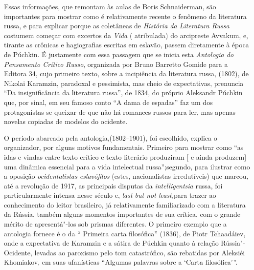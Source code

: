 Essas informações, que remontam às aulas de Boris Schnaiderman, são
importantes para mostrar como é relativamente recente o fenômeno da
literatura russa, e para explicar porque as coletâneas de \emph{História
da Literatura Russa} costumem começar com excertos da \emph{Vida} (
atribulada) do arcipreste Avvakum, e, tirante as crônicas e hagiografias
escritas em eslavão, passem diretamente à época de Púchkin. É
justamente com essa passagem que se inicia esta \emph{Antologia do
Pensamento Crítico Russo}, organizada por Bruno Barretto Gomide para a Editora 34, cujo
primeiro texto, sobre a incipiência da literatura russa, (1802), de
Nikolai Karamzin, paradoxal e pessimista, mas cheio de expectativas,
prenuncia ``Da insignificância da literatura russa'', de 1834, do
próprio Aleksandr Púchkin que, por sinal, em seu famoso conto ``A dama
de espadas'' faz um dos protagonistas se queixar de que não há romances
russos para ler, mas apenas novelas copiadas de modelos do ocidente.

O período abarcado pela antologia,(1802--1901), foi escolhido, explica o
organizador, por alguns motivos fundamentais. Primeiro para mostrar como
``as idas e vindas entre texto crítico e texto literário produziram [
e ainda produzem] uma dinâmica essencial para a vida intelectual
russa'';segundo, para ilustrar como a oposição \emph{ocidentalistas 
eslavófilos} (estes, nacionalistas irredutíveis) que marcou, até a revolução
de 1917, as principais disputas da \emph{intelligentsia} russa, foi
particularmente intensa nesse século e, \emph{last but not least,}para
trazer ao conhecimento do leitor brasileiro, já relativamente
familiarizado com a literatura da Rússia, também alguns momentos
importantes de sua crítica, com o grande mérito de apresentá"-los sob
prismas diferentes. O primeiro exemplo que a antologia fornece é o da ``
Primeira carta filosófica'' (1836), de Piotr Tchaadáiev, onde a
expectativa de Karamzin e a sátira de Púchkin quanto à relação
Rússia"-Ocidente, levadas ao paroxismo pelo tom catastrófico, são
rebatidas por Aleksiéi Khomiakov, em suas ufanísticas ``Algumas
palavras sobre a `Carta filosófica'''.

